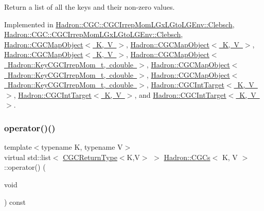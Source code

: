 Return a list of all the keys and their non-\/zero values. 



Implemented in \mbox{\hyperlink{classHadron_1_1CGC_1_1CGCIrrepMomLGxLGtoLGEnv_1_1Clebsch_a27a81332c929b1f421704680e794b796}{Hadron\+::\+C\+G\+C\+::\+C\+G\+C\+Irrep\+Mom\+L\+Gx\+L\+Gto\+L\+G\+Env\+::\+Clebsch}}, \mbox{\hyperlink{classHadron_1_1CGC_1_1CGCIrrepMomLGxLGtoLGEnv_1_1Clebsch_a27a81332c929b1f421704680e794b796}{Hadron\+::\+C\+G\+C\+::\+C\+G\+C\+Irrep\+Mom\+L\+Gx\+L\+Gto\+L\+G\+Env\+::\+Clebsch}}, \mbox{\hyperlink{classHadron_1_1CGCMapObject_aaa4b18e1a2845e16154cd434462c0779}{Hadron\+::\+C\+G\+C\+Map\+Object$<$ K, V $>$}}, \mbox{\hyperlink{classHadron_1_1CGCMapObject_aaa4b18e1a2845e16154cd434462c0779}{Hadron\+::\+C\+G\+C\+Map\+Object$<$ K, V $>$}}, \mbox{\hyperlink{classHadron_1_1CGCMapObject_aaa4b18e1a2845e16154cd434462c0779}{Hadron\+::\+C\+G\+C\+Map\+Object$<$ K, V $>$}}, \mbox{\hyperlink{classHadron_1_1CGCMapObject_aaa4b18e1a2845e16154cd434462c0779}{Hadron\+::\+C\+G\+C\+Map\+Object$<$ Hadron\+::\+Key\+C\+G\+C\+Irrep\+Mom\+\_\+t, cdouble $>$}}, \mbox{\hyperlink{classHadron_1_1CGCMapObject_aaa4b18e1a2845e16154cd434462c0779}{Hadron\+::\+C\+G\+C\+Map\+Object$<$ Hadron\+::\+Key\+C\+G\+C\+Irrep\+Mom\+\_\+t, cdouble $>$}}, \mbox{\hyperlink{classHadron_1_1CGCMapObject_aaa4b18e1a2845e16154cd434462c0779}{Hadron\+::\+C\+G\+C\+Map\+Object$<$ Hadron\+::\+Key\+C\+G\+C\+Irrep\+Mom\+\_\+t, cdouble $>$}}, \mbox{\hyperlink{classHadron_1_1CGCIntTarget_ae6c0ce90fe1f8a2880984df1e2e44c18}{Hadron\+::\+C\+G\+C\+Int\+Target$<$ K, V $>$}}, \mbox{\hyperlink{classHadron_1_1CGCIntTarget_ae6c0ce90fe1f8a2880984df1e2e44c18}{Hadron\+::\+C\+G\+C\+Int\+Target$<$ K, V $>$}}, and \mbox{\hyperlink{classHadron_1_1CGCIntTarget_ae6c0ce90fe1f8a2880984df1e2e44c18}{Hadron\+::\+C\+G\+C\+Int\+Target$<$ K, V $>$}}.

\mbox{\label{classHadron_1_1CGCs_ac709374b31c0319e82028b9d7c23e993}} 
\subsubsection{\texorpdfstring{operator()()}{operator()()}\hspace{0.1cm}{\footnotesize\ttfamily [3/6]}}
{\footnotesize\ttfamily template$<$typename K, typename V$>$ \\
virtual std\+::list$<$ \mbox{\hyperlink{structHadron_1_1CGCReturnType}{C\+G\+C\+Return\+Type}}$<$K,V$>$ $>$ \mbox{\hyperlink{classHadron_1_1CGCs}{Hadron\+::\+C\+G\+Cs}}$<$ K, V $>$\+::operator() (\begin{DoxyParamCaption}\item[{void}]{ }\end{DoxyParamCaption}) const\hspace{0.3cm}{\ttfamily [pure virtual]}}



